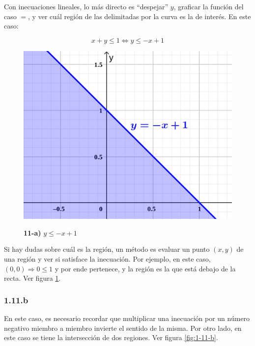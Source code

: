\documentclass{article}
\begin{document}
Con inecuaciones lineales, lo más directo es ``despejar'' $y$, graficar la función del caso $=$, y ver cuál región de las delimitadas por la curva es la de interés. En este caso:

\begin{equation}
x + y \leq 1 \Leftrightarrow y \leq -x + 1
\end{equation}

\begin{figure}[ht]
\caption{\textbf{11-a)} $y \leq -x + 1$}
\includegraphics[scale=2.75]{img/ejercicios/1/11-a.png} 
\centering
\label{fig:1-11-a}
\end{figure}

Si hay dudas sobre cuál es la región, un método es evaluar un punto $(x,y)$ de una región y ver si satisface la inecuación. Por ejemplo, en este caso, $(0,0) \Rightarrow 0 \leq 1$ y por ende pertenece, y la región es la que está debajo de la recta. Ver figura \ref{fig:1-11-a}.

\subsubsection*{1.11.b}
\label{subsubsec:1.11.b}

En este caso, es necesario recordar que multiplicar una inecuación por un número negativo miembro a miembro invierte el sentido de la misma. Por otro lado, en este caso se tiene la intersección de dos regiones. Ver figura \ref{fig:1-11-b}.
\end{document}
